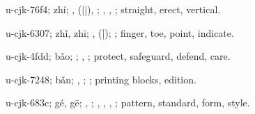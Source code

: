\begin{multicols}{2}
{\cjkgGlue{}u-cjk-76f4; zhí; \cjkgGlue{}\cjkgGlue{}\cjkgGlue{}, \cjkgGlue{}\cjkgGlue{}(\cjkgGlue{}|\cjkgGlue{}|\cjkgGlue{}), \cjkgGlue{}\cjkgGlue{}\cjkgGlue{}; \cjkgGlue{}, \cjkgGlue{}, \cjkgGlue{}; straight, erect, vertical.

\cjkgGlue{}u-cjk-6307; zhǐ, zhī; \cjkgGlue{}, \cjkgGlue{}\cjkgGlue{}(\cjkgGlue{}|\cjkgGlue{}); \cjkgGlue{}; finger, toe, point, indicate.

\cjkgGlue{}u-cjk-4fdd; bǎo; \cjkgGlue{}\cjkgGlue{}\cjkgGlue{}; \cjkgGlue{}, \cjkgGlue{}; protect, safeguard, defend, care.

\cjkgGlue{}u-cjk-7248; bǎn; \cjkgGlue{}, \cjkgGlue{}; \cjkgGlue{}; printing blocks, edition.

\cjkgGlue{}u-cjk-683c; gé, gē; \cjkgGlue{}, \cjkgGlue{}; \cjkgGlue{}, \cjkgGlue{}, \cjkgGlue{}, \cjkgGlue{}; pattern, standard, form, style.

}
\end{multicols}
